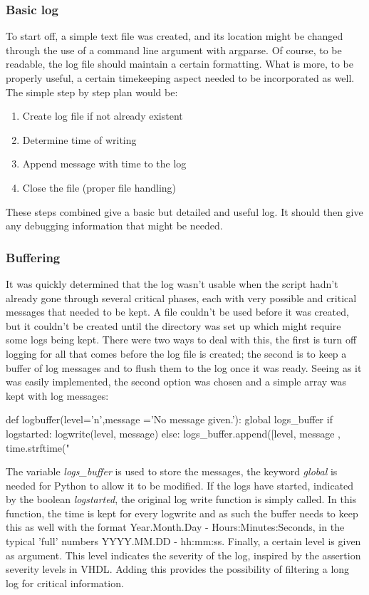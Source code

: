 \documentclass[11pt,british]{article}
\begin{document}
\subsubsection{Basic log}
To start off, a simple text file was created, and its location might be changed through the use of a command line argument with argparse. Of course, to be readable, the log file should maintain a certain formatting. What is more, to be properly useful, a certain timekeeping aspect needed to be incorporated as well. The simple step by step plan would be:
\begin{enumerate}[itemsep=-0.1cm]
\item Create log file if not already existent
\item Determine time of writing
\item Append message with time to the log
\item Close the file (proper file handling)
\end{enumerate}
These steps combined give a basic but detailed and useful log. It should then give any debugging information that might be needed.

\subsubsection{Buffering}
It was quickly determined that the log wasn't usable when the script hadn't already gone through several critical phases, each with very possible and critical messages that needed to be kept. A file couldn't be used before it was created, but it couldn't be created until the directory was set up which might require some logs being kept. There were two ways to deal with this, the first is turn off logging for all that comes before the log file is created; the second is to keep a buffer of log messages and to flush them to the log once it was ready. Seeing as it was easily implemented, the second option was chosen and a simple array was kept with log messages:
\begin{python}
def logbuffer(level='n',message ='No message given.'):
    global logs_buffer 
    if logstarted:
        logwrite(level, message)
    else:
        logs_buffer.append([level, message
        					, time.strftime("%
\end{python}
The variable \emph{logs\_buffer} is used to store the messages, the keyword \emph{global} is needed for Python to allow it to be modified. If the logs have started, indicated by the boolean \emph{logstarted}, the original log write function is simply called. In this function, the time is kept for every logwrite and as such the buffer needs to keep this as well with the format Year.Month.Day - Hours:Minutes:Seconds, in the typical 'full' numbers YYYY.MM.DD - hh:mm:ss. Finally, a certain level is given as argument. This level indicates the severity of the log, inspired by the assertion severity levels in \gls{VHDL}. Adding this provides the possibility of filtering a long log for critical information.
\end{document}
